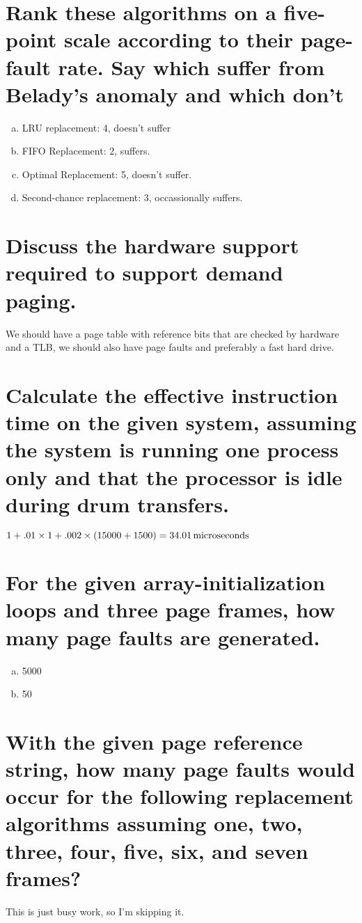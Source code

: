 \documentclass{book}%
\begin{document}
\section{Rank these algorithms on a five-point scale according to their page-fault rate. Say which suffer from Belady's anomaly and which don't}
\begin{enumerate}[(a)]
\item LRU replacement: 4, doesn't suffer
\item FIFO Replacement: 2, suffers.
\item Optimal Replacement: 5, doesn't suffer.
\item Second-chance replacement: 3, occassionally suffers. 
\end{enumerate}
\section{Discuss the hardware support required to support demand paging.}
We should have a page table with reference bits that are checked by hardware and a TLB, we should also have page faults and preferably a fast hard drive.
\section{Calculate the effective instruction time on the given system, assuming the system is running one process only and that the processor is idle during drum transfers.}
$1+.01\times1+.002\times(15000+1500)=\unit[34.01]{microseconds}$
\section{For the given array-initialization loops and three page frames, how many page faults are generated.}
\begin{enumerate}[a.]
\item 5000
\item 50
\end{enumerate}
\section{With the given page reference string, how many page faults would occur for the following replacement algorithms assuming one, two, three, four, five, six, and seven frames?}
This is just busy work, so I'm skipping it.
\end{document}
